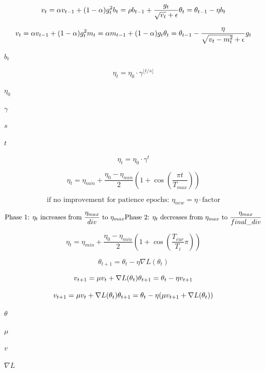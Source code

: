 \documentclass{article}
\begin{document}
\[v_t = \alpha v_{t-1} + (1 - \alpha) g_t^2 \\
b_t = \rho b_{t-1} + \frac{g_t}{\sqrt{v_t} + \epsilon} \\
\theta_t = \theta_{t-1} - \eta b_t
\]
\pagebreak

\[v_t = \alpha v_{t-1} + (1 - \alpha) g_t^2 \\
m_t = \alpha m_{t-1} + (1 - \alpha) g_t \\
\theta_t = \theta_{t-1} - \frac{\eta}{\sqrt{v_t - m_t^2} + \epsilon} g_t
\]
\pagebreak

$b_t$
\pagebreak

\[\eta_t = \eta_0 \cdot \gamma^{\lfloor t / s \rfloor}
\]
\pagebreak

$\eta_0$
\pagebreak

$\gamma$
\pagebreak

$s$
\pagebreak

$t$
\pagebreak

\[\eta_t = \eta_0 \cdot \gamma^t
\]
\pagebreak

\[\eta_t = \eta_{min} + \frac{\eta_0 - \eta_{min}}{2}\left(1 + \cos\left(\frac{\pi t}{T_{max}}\right)\right)
\]
\pagebreak

\[\text{if no improvement for patience epochs: } \eta_{new} = \eta \cdot \text{factor}
\]
\pagebreak

\[\text{Phase 1: } \eta_t \text{ increases from } \frac{\eta_{max}}{div} \text{ to } \eta_{max} \\
\text{Phase 2: } \eta_t \text{ decreases from } \eta_{max} \text{ to } \frac{\eta_{max}}{final\_div}
\]
\pagebreak

\[\eta_t = \eta_{min} + \frac{\eta_0 - \eta_{min}}{2}\left(1 + \cos\left(\frac{T_{cur}}{T_i}\pi\right)\right)
\]
\pagebreak

\[\theta_{t+1} = \theta_t - \eta \nabla L(\theta_t)
\]
\pagebreak

\[v_{t+1} = \mu v_t + \nabla L(\theta_t) \\
\theta_{t+1} = \theta_t - \eta v_{t+1}
\]
\pagebreak

\[v_{t+1} = \mu v_t + \nabla L(\theta_t) \\
\theta_{t+1} = \theta_t - \eta(\mu v_{t+1} + \nabla L(\theta_t))
\]
\pagebreak

$\theta$
\pagebreak

$\mu$
\pagebreak

$v$
\pagebreak

$\nabla L$
\pagebreak
\end{document}
